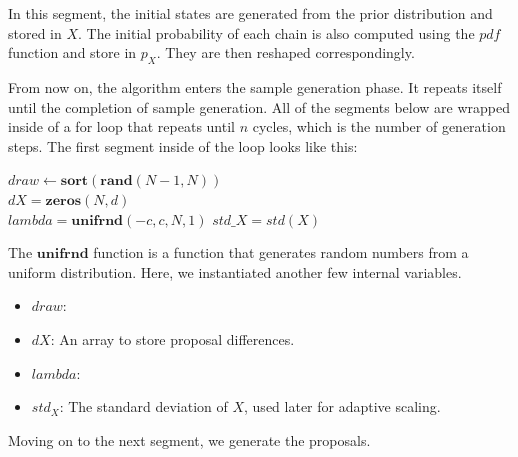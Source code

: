 In this segment, the initial states are generated from the prior distribution and stored in $X$. The initial probability of each chain is also computed using the $pdf$ function and store in $p_X$. They are then reshaped correspondingly.

From now on, the algorithm enters the sample generation phase. It repeats itself until the completion of sample generation. All of the segments below are wrapped inside of a for loop that repeats until $n$ cycles, which is the number of generation steps. The first segment inside of the loop looks like this:

\begin{algorithm}[H]
$ draw \gets \textbf{sort}(\textbf{rand}(N-1, N))$\\
$dX = \textbf{zeros}(N, d)$\\
$lambda = \textbf{unifrnd}(-c, c, N, 1)$
$std\_X = std(X)$
\end{algorithm}

The $\textbf{unifrnd}$ function is a function that generates random numbers from a uniform distribution. Here, we instantiated another few internal variables.
\begin{itemize}
    \item $draw$:
    \item $dX$: An array to store proposal differences.
    \item $lambda$: 
    \item $std_X$: The standard deviation of $X$, used later for adaptive scaling.
\end{itemize}

Moving on to the next segment, we generate the proposals.

\begin{algorithm}[H]
\end{algorithm}

